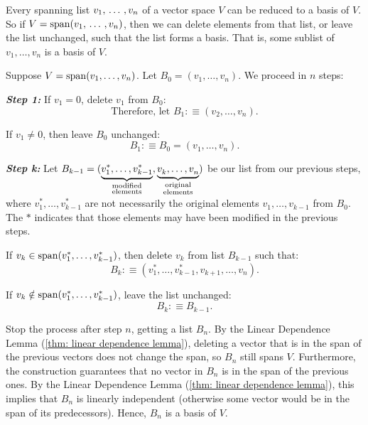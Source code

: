 \setcounter{thm}{29}
\begin{thm} 
  \label{thm: every spanning list contains a basis}
  Every spanning list $v_1, {\, \ldots \,\,}, v_n$ of a vector space $V$ can be reduced to a basis of $V$. So if $V= \operatorname{span} (v_1, {\, \ldots \,\,}, v_n)$, then we can delete elements from that list, or leave the list unchanged, such that the list forms a basis. That is, some sublist of $v_1, \dots, v_n$ is a basis of $V$.
\end{thm}
\begin{prf}
  Suppose $V = \operatorname{span} (v_1, \ldots, v_n)$. Let $B_0 = (v_1, \ldots, v_n)$. We proceed in $n$ steps:

  \emph{\bfseries Step 1: }
  If $v_1 = 0$, delete $v_1$ from $B_0$:
  \begin{equation}
    \text{Therefore, let } B_1 :\equiv (v_2, \ldots, v_n).
  \end{equation}

  If $v_1 \neq 0$, then leave $B_0$ unchanged:
  \begin{equation}
    B_1 :\equiv B_0=(v_1, \ldots, v_n).
  \end{equation}

  \emph{\bfseries Step k: }
  Let $B_{k-1} = (\underbrace{v_{1}^*, \ldots, v_{k-1}^*}_{\substack{\text{modified} \\ \text{elements}}}, \underbrace{v^{\vphantom{*}}_{k}, \ldots, v^{\vphantom{*}}_n}_{\substack{\text{original} \\ \text{elements}}})$ be our list from our previous steps, where $v_1^*, \ldots, v_{k-1}^*$ are not necessarily the original elements $v_1, \ldots, v_{k-1}$ from $B_0$. The $*$ indicates that those elements may have been modified in the previous steps.

  If $v_k \in \operatorname{span} (v_1^*, \ldots, v_{k-1}^*)$, then delete $v_k$ from list $B_{k-1}$ such that:
  \begin{equation}
    B_k :\equiv (v_{1}^*, \ldots, v_{k-1}^*, v_{k+1}, \ldots, v_n).
  \end{equation}

  If $v_k \notin \operatorname{span} (v_1^*, \ldots, v_{k-1}^*)$, leave the list unchanged:
  \begin{equation}
    B_k :\equiv B_{k-1}.
  \end{equation}

  Stop the process after step $n$, getting a list $B_n$. By the Linear Dependence Lemma (\ref{thm: linear dependence lemma}), deleting a vector that is in the span of the previous vectors does not change the span, so $B_n$ still spans $V$. Furthermore, the construction guarantees that no vector in $B_n$ is in the span of the previous ones. By the Linear Dependence Lemma (\ref{thm: linear dependence lemma}), this implies that $B_n$ is linearly independent (otherwise some vector would be in the span of its predecessors). Hence, $B_n$ is a basis of $V$.
\end{prf}

